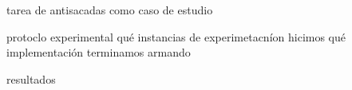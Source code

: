 \documentclass{beamer}
\begin{document}
tarea de antisacadas como caso de estudio

protoclo experimental
qué instancias de experimetacníon hicimos
qué implementación terminamos armando

resultados
  


% 
% 
% 
% 
% 
% 
% 
% 
% 
% 
\end{document}
